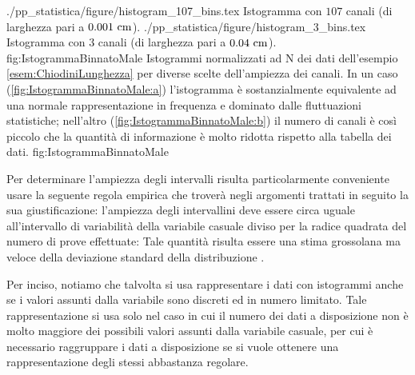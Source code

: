\panelfig
{\twobyonetexfig
{./pp_statistica/figure/histogram_107_bins.tex}
{Istogramma con $107$ canali (di larghezza pari a $0.001 ~{\rm cm}$).}
{./pp_statistica/figure/histogram_3_bins.tex}
{Istogramma con $3$ canali (di larghezza pari a $0.04 ~{\rm cm}$).}
{fig:IstogrammaBinnatoMale}}
{Istogrammi normalizzati ad N dei dati dell'esempio
\ref{esem:ChiodiniLunghezza} per diverse scelte dell'ampiezza dei canali.
In un caso (\ref{fig:IstogrammaBinnatoMale:a}) l'istogramma \`e
sostanzialmente equivalente ad una normale rappresentazione in frequenza e
dominato dalle fluttuazioni statistiche; nell'altro
(\ref{fig:IstogrammaBinnatoMale:b}) il numero di canali
\`e cos\`i piccolo che la quantit\`a di informazione \`e molto ridotta
rispetto alla tabella dei dati.}
{fig:IstogrammaBinnatoMale}

Per determinare l'ampiezza degli intervalli risulta particolarmente conveniente
usare la seguente regola empirica che trover\`a negli argomenti trattati in
seguito la sua giustificazione: l'ampiezza degli intervallini
deve essere circa uguale all'intervallo di variabilit\`a della
variabile casuale diviso per la radice quadrata del numero di prove effettuate:
Tale quantit\`a risulta essere una stima grossolana ma veloce della deviazione
standard della distribuzione \cite{Kyker, McGovern}.


\begin{exemplify}


\end{exemplify}

\noindent Per inciso, notiamo che talvolta si usa rappresentare i dati con
istogrammi anche se i valori assunti dalla variabile sono discreti
ed in numero limitato.
Tale rappresentazione si usa solo nel caso in cui il numero dei dati a
disposizione non \`e molto maggiore dei possibili valori assunti dalla
variabile casuale, per cui \`e necessario raggruppare i dati a disposizione se
si vuole ottenere una rappresentazione degli stessi abbastanza regolare.



